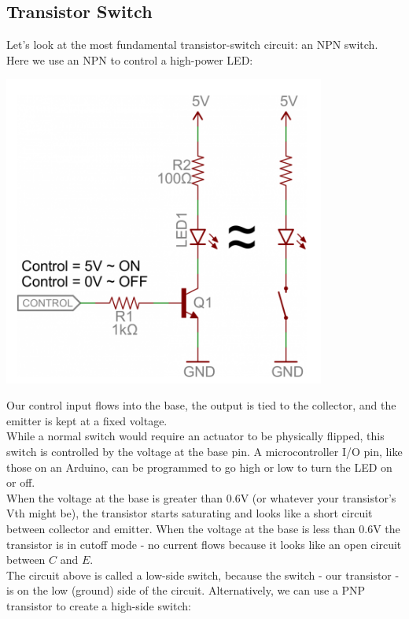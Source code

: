 \documentclass[a4paper, 11pt]{article} %
\begin{document}
\subsection*{Transistor Switch}

Let's look at the most fundamental transistor-switch circuit: an NPN switch. Here we use an NPN to control a high-power LED:

\begin{center}
\includegraphics[width=300pt]{tran14}
\end{center}

Our control input flows into the base, the output is tied to the collector, and the emitter is kept at a fixed voltage.\\

While a normal switch would require an actuator to be physically flipped, this switch is controlled by the voltage at the base pin. A microcontroller I/O pin, like those on an Arduino, can be programmed to go high or low to turn the LED on or off.\\

When the voltage at the base is greater than 0.6V (or whatever your transistor's Vth might be), the transistor starts saturating and looks like a short circuit between collector and emitter. When the voltage at the base is less than 0.6V the transistor is in cutoff mode - no current flows because it looks like an open circuit between $C$ and $E$.\\

The circuit above is called a low-side switch, because the switch - our transistor - is on the low (ground) side of the circuit. Alternatively, we can use a PNP transistor to create a high-side switch:
\end{document}
